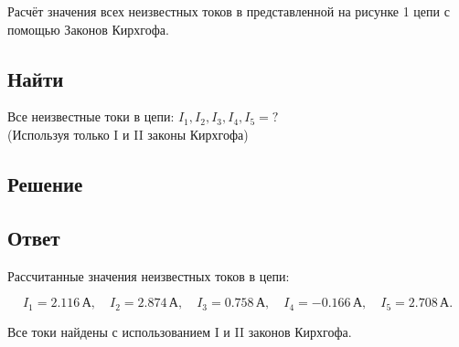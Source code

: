 Расчёт значения всех неизвестных токов в представленной на рисунке 1 цепи с помощью Законов Кирхгофа.

\subsection{Найти}
Все неизвестные токи в цепи: \(I_1, I_2, I_3, I_4, I_5 = ?\) \\
(Используя только I и II законы Кирхгофа)

\subsection{Решение}


\subsection{Ответ}
Рассчитанные значения неизвестных токов в цепи:

\[
I_1 = 2.116 \, \text{А}, \quad
I_2 = 2.874 \, \text{А}, \quad
I_3 = 0.758 \, \text{А}, \quad
I_4 = -0.166 \, \text{А}, \quad
I_5 = 2.708 \, \text{А}.
\]

Все токи найдены с использованием I и II законов Кирхгофа.
